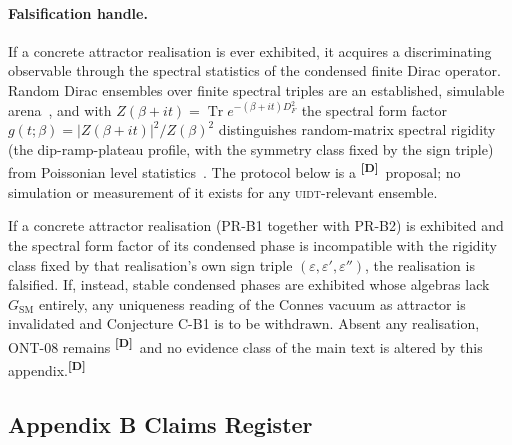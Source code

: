 \documentclass[12pt,a4paper,twoside]{article}
\theoremstyle{plain}
\theoremstyle{definition}
\theoremstyle{remark}
\newcommand{\UIDT}{\textsc{uidt}}
\newcommand{\catmark}[1]{\textsuperscript{\textsf{\textbf{[#1]}}}}
\begin{document}
\paragraph{Falsification handle.}
If a concrete attractor realisation is ever exhibited, it acquires a
discriminating observable through the spectral statistics of the condensed
finite Dirac operator. Random Dirac ensembles over finite spectral triples
are an established, simulable arena~\cite{barrettglaser2016}, and with
$Z(\beta+it)=\operatorname{Tr}e^{-(\beta+it)D_F^{2}}$ the spectral form
factor $g(t;\beta)=\lvert Z(\beta+it)\rvert^{2}/Z(\beta)^{2}$
distinguishes random-matrix spectral rigidity (the dip-ramp-plateau
profile, with the symmetry class fixed by the sign triple) from Poissonian
level statistics~\cite{cotler2017}. The protocol below is a \catmark{D}\
proposal; no simulation or measurement of it exists for any \UIDT-relevant
ensemble.

\begin{killswitch}
If a concrete attractor realisation (PR-B1 together with PR-B2) is
exhibited and the spectral form factor of its condensed phase is
incompatible with the rigidity class fixed by that realisation's own sign
triple $(\varepsilon,\varepsilon',\varepsilon'')$, the realisation is
falsified. If, instead, stable condensed phases are exhibited whose
algebras lack $G_{\mathrm{SM}}$ entirely, any uniqueness reading of the
Connes vacuum as attractor is invalidated and Conjecture C-B1 is to be
withdrawn. Absent any realisation, ONT-08 remains \catmark{D}\ and no
evidence class of the main text is altered by this appendix.\catmark{D}
\end{killswitch}

\subsection{Appendix B Claims Register}
\label{app:b-claims-register}
\end{document}

